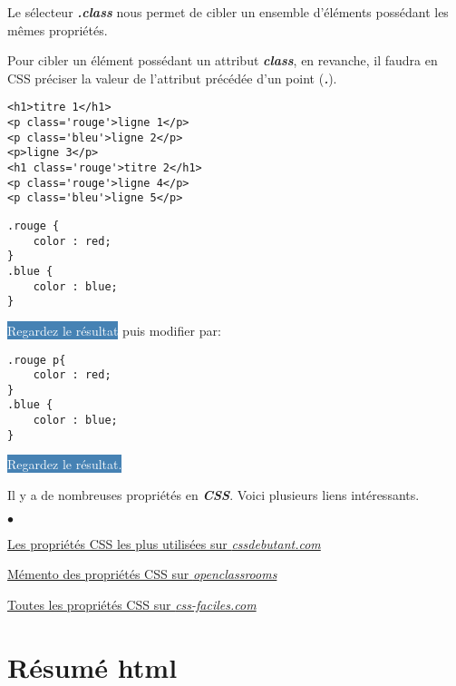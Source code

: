 \documentclass[10pt,dvipsnames, dvips, svgnames]{article}
\begin{document}
 Le sélecteur \textbf{\textit{.class}} nous permet de cibler un ensemble d'éléments possédant les mêmes propriétés.

 Pour cibler un élément possédant un attribut \textbf{\textit{class}}, en revanche, il faudra en CSS préciser la valeur de l'attribut précédée d'un point (\textbf{\textit{.}}).


\begin{lstlisting}
<h1>titre 1</h1>
<p class='rouge'>ligne 1</p>
<p class='bleu'>ligne 2</p>
<p>ligne 3</p>
<h1 class='rouge'>titre 2</h1>
<p class='rouge'>ligne 4</p>
<p class='bleu'>ligne 5</p>
\end{lstlisting}

\begin{lstlisting}
.rouge {
	color : red;
}
.blue {
	color : blue;
}
\end{lstlisting}

\colorbox{SteelBlue}{\textcolor{white}{Regardez le résultat}} puis modifier par:

\begin{lstlisting}
.rouge p{
	color : red;
}
.blue {
	color : blue;
}
\end{lstlisting}

\colorbox{SteelBlue}{\textcolor{white}{Regardez le résultat.}}


Il y a de nombreuses propriétés en \textbf{\textit{CSS}}.  Voici plusieurs liens intéressants.

\begin{list}{$\bullet$}{}
\item \href{https://www.cssdebutant.com/debuter-en-css-les-definitions-css.html}{Les propriétés CSS les plus utilisées sur \textit{cssdebutant.com}}
\item \href{https://openclassrooms.com/fr/courses/1603881-apprenez-a-creer-votre-site-web-avec-html5-et-css3/1608902-memento-des-proprietes-css}{Mémento des propriétés CSS sur \textit{openclassrooms}}
\item \href{http://www.css-faciles.com/proprietes-css-liste-alphabetique.php}{Toutes les propriétés CSS sur \textit{css-faciles.com}}
\end{list}



\section{Résumé  html}
\end{document}
